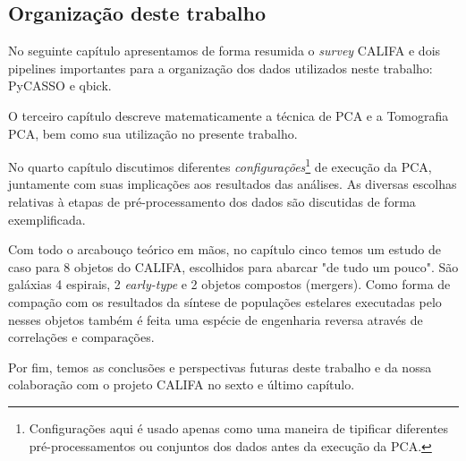 \subsection{Organização deste trabalho}

No seguinte capítulo apresentamos de forma resumida o {\em survey} CALIFA e dois pipelines importantes para a
organização dos dados utilizados neste trabalho: PyCASSO e {\sc qbick}.

O terceiro capítulo descreve matematicamente a técnica de PCA e a Tomografia PCA, bem como sua utilização no presente trabalho. 

No quarto capítulo discutimos diferentes {\em configurações}\footnote{Configurações aqui é usado apenas como uma maneira
de tipificar diferentes pré-processamentos ou conjuntos dos dados antes da execução da PCA.} de execução da PCA,
juntamente com suas implicações aos resultados das análises. As diversas escolhas relativas à etapas de
pré-processamento dos dados são discutidas de forma exemplificada.

Com todo o arcabouço teórico em mãos, no capítulo cinco temos um estudo de caso para 8 objetos do CALIFA, escolhidos
para abarcar "de tudo um pouco". São galáxias 4 espirais, 2 {\em early-type} e 2 objetos compostos (mergers). Como
forma de compação com os resultados da síntese de populações estelares executadas pelo \starlight nesses objetos também
é feita uma espécie de engenharia reversa através de correlações e comparações.

Por fim, temos as conclusões e perspectivas futuras deste trabalho e da nossa colaboração com o projeto CALIFA no sexto
e último capítulo. 

